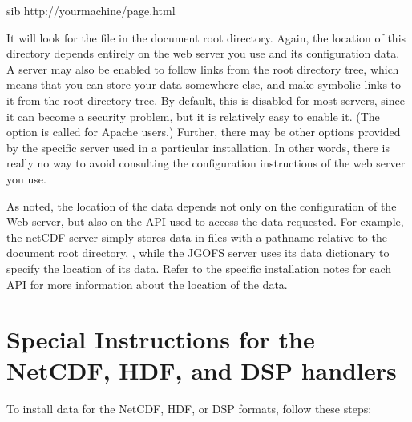 \documentclass{dods-book}
\begin{document}
\begin{vcode}{sib}
http://yourmachine/page.html
\end{vcode}

It will look for the file  in the document root
directory.  Again, the location of this directory depends entirely on
the web server you use and its configuration data.  A server may also
be enabled to follow links from the root directory tree, which means
that you can store your data somewhere else, and make symbolic links
to it from the root directory tree.  By default, this is disabled for
most servers, since it can become a security problem, but it is
relatively easy to enable it.  (The option is called
 for Apache users.)  Further, there may be 
other options provided by the specific server used in a particular
installation.  In other words, there is really no way to avoid
consulting the configuration instructions of the web server you use.


As noted, the location of the data depends not only on the
  configuration of the Web
server, but also on the API used to access the data requested.  For
example, the netCDF server simply stores data in files with a pathname
relative to the document root directory, , while the JGOFS
server uses its data dictionary to specify the location of its data.
Refer to the specific installation notes for each API for more
information about the location of the data.

\section{Special Instructions for the NetCDF, HDF, and DSP handlers}

To install data for the NetCDF, HDF, or DSP formats, follow these
steps:

\end{document}
